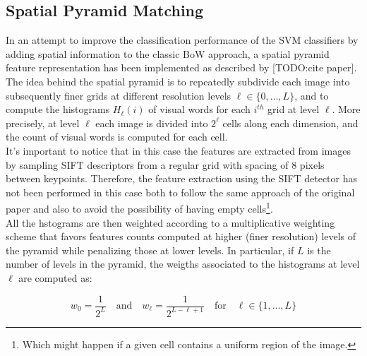 \documentclass[../main.tex]{subfiles}
\begin{document}
\subsection{Spatial Pyramid Matching}\label{subsec:spatial-pyramid}

In an attempt to improve the classification performance of the SVM classifiers by adding spatial information to the classic BoW approach, a spatial pyramid feature representation has been implemented as described by  [TODO:cite paper].\\
The idea behind the spatial pyramid is to repeatedly subdivide each image into subsequently finer grids at different resolution levels $\ell \in \{0,\dots,L\}$, and to compute the histograms $H_{\ell}(i)$ of visual words for each $i^{th}$ grid at level $\ell$. More precisely, at level $\ell$ each image is divided into $2^{\ell}$ cells along each dimension, and the count of visual words is computed for each cell.\\
It's important to notice that in this case the features are extracted from images by sampling SIFT descriptors from a regular grid with spacing of $8$ pixels between keypoints. Therefore, the feature extraction using the SIFT detector has not been performed in this case both to follow the same approach of the original paper and also to avoid the possibility of having empty cells\footnote{Which might happen if a given cell contains a uniform region of the image.}.\\
All the hstograms are then weighted according to a multiplicative weighting scheme that favors features counts computed at higher (finer resolution) levels of the pyramid while penalizing those at lower levels. In particular, if $L$ is the number of levels in the pyramid, the weigths associated to the histograms at level $\ell$ are computed as:

\begin{equation}
    w_{0} = \frac{1}{2^{L}} \quad \text{and} \quad w_{\ell} = \frac{1}{2^{L-\ell+1}} \quad \text{for} \quad \ell \in \{1,\dots,L\}
\end{equation}
\end{document}

